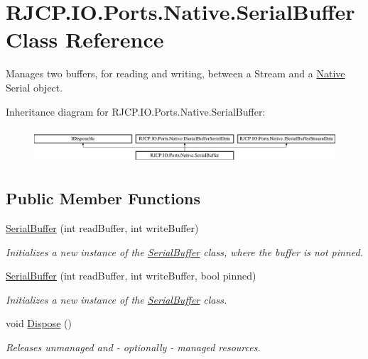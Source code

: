 \hypertarget{class_r_j_c_p_1_1_i_o_1_1_ports_1_1_native_1_1_serial_buffer}{}\section{R\+J\+C\+P.\+I\+O.\+Ports.\+Native.\+Serial\+Buffer Class Reference}
\label{class_r_j_c_p_1_1_i_o_1_1_ports_1_1_native_1_1_serial_buffer}


Manages two buffers, for reading and writing, between a Stream and a \mbox{\hyperlink{namespace_r_j_c_p_1_1_i_o_1_1_ports_1_1_native}{Native}} Serial object.  


Inheritance diagram for R\+J\+C\+P.\+I\+O.\+Ports.\+Native.\+Serial\+Buffer\+:\begin{figure}[H]
\begin{center}
\leavevmode
\includegraphics[height=1.323877cm]{class_r_j_c_p_1_1_i_o_1_1_ports_1_1_native_1_1_serial_buffer}
\end{center}
\end{figure}
\subsection*{Public Member Functions}
\begin{DoxyCompactItemize}
\item 
\mbox{\hyperlink{class_r_j_c_p_1_1_i_o_1_1_ports_1_1_native_1_1_serial_buffer_aace64e48316ea242d364e9fba722f11e}{Serial\+Buffer}} (int read\+Buffer, int write\+Buffer)
\begin{DoxyCompactList}\small\item\em Initializes a new instance of the \mbox{\hyperlink{class_r_j_c_p_1_1_i_o_1_1_ports_1_1_native_1_1_serial_buffer}{Serial\+Buffer}} class, where the buffer is not pinned. \end{DoxyCompactList}\item 
\mbox{\hyperlink{class_r_j_c_p_1_1_i_o_1_1_ports_1_1_native_1_1_serial_buffer_a09055fac81a27743d123f7a66a6ae622}{Serial\+Buffer}} (int read\+Buffer, int write\+Buffer, bool pinned)
\begin{DoxyCompactList}\small\item\em Initializes a new instance of the \mbox{\hyperlink{class_r_j_c_p_1_1_i_o_1_1_ports_1_1_native_1_1_serial_buffer}{Serial\+Buffer}} class. \end{DoxyCompactList}\item 
void \mbox{\hyperlink{class_r_j_c_p_1_1_i_o_1_1_ports_1_1_native_1_1_serial_buffer_aebcd4853ec15a7ee302428598a854173}{Dispose}} ()
\begin{DoxyCompactList}\small\item\em Releases unmanaged and -\/ optionally -\/ managed resources. \end{DoxyCompactList}\end{DoxyCompactItemize}
